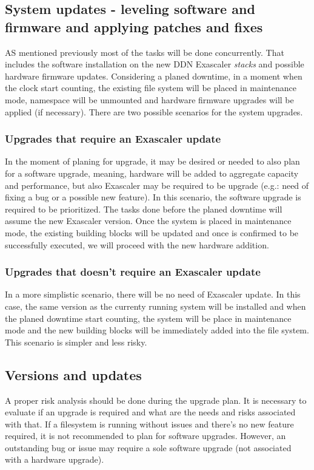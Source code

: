 \documentclass{article}
\begin{document}
\subsection{System updates - leveling software and firmware and applying patches and fixes}
AS mentioned previously most of the tasks will be done concurrently. That includes the software installation on the new DDN Exascaler \textit{stacks} and possible hardware firmware updates. Considering a planed downtime, in a moment when the clock start counting, the existing file system will be placed in maintenance mode, namespace will be unmounted and hardware firmware upgrades will be applied (if necessary). There are two possible scenarios for the system upgrades.
\subsubsection{Upgrades that require an Exascaler update}
In the moment of planing for upgrade, it may be desired or needed to also plan for a software upgrade, meaning, hardware will be added to aggregate capacity and performance, but also Exascaler may be required to be upgrade (e.g.: need of fixing a bug or a possible new feature). In this scenario, the software upgrade is required to be prioritized. The tasks done before the planed downtime will assume the new Exascaler version. Once the system is placed in maintenance mode, the existing building blocks will be updated and once is confirmed to be successfully executed, we will proceed with the new hardware addition.

\subsubsection{Upgrades that doesn't require an Exascaler update}
In a more simplistic scenario, there will be no need of Exascaler update. In this case, the same version as the currenty running system will be installed and when the planed downtime start counting, the system will be place in maintenance mode and the new building blocks will be immediately added into the file system. This scenario is simpler and less risky.

\subsection{Versions and updates}
A proper risk analysis should be done during the upgrade plan. It is necessary to evaluate if an upgrade is required and what are the needs and risks associated with that. If a filesystem is running without issues and there's no new feature required, it is not recommended to plan for software upgrades. However, an outstanding bug or issue may require a sole software upgrade (not associated with a hardware upgrade).
\end{document}
